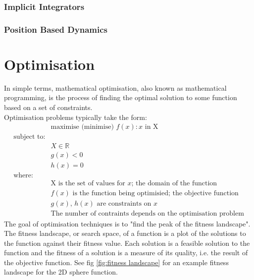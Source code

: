 \subsubsection{Implicit Integrators}

\subsubsection{Position Based Dynamics}

\section{Optimisation}
In simple terms, mathematical optimisation, also known as mathematical programming, is the process of finding the optimal solution to some function based on a set of constraints.
\\Optimisation problems typically take the form\cite{mathprog}:
\begin{equation}
  \begin{split}
    &\text{maximise (minimise) } f(x) : x \text{ in X}
    \\\text{subject to:}
    \\&X \in \mathbb{R}
    \\&g(x) < 0
    \\&h(x) = 0
    \\\text{where:}
    \\&\text{X is the set of values for } x \text{; the domain of the function}
    \\&f(x) \text{ is the function being optimisied; the objective function}
    \\&g(x) \text{, } h(x) \text{ are constraints on } x 
    \\&\text{The number of contraints depends on the optimisation problem}
  \end{split}
\label{eq:optimisation}
\end{equation}
The goal of optimisation techniques is to "find the peak of the fitness landscape"\cite{stoch}. The fitness landscape, or search space, of a function is a plot of the solutions to the function against their fitness value. Each solution is a feasible solution to the function and the fitness of a solution is a measure of its quality, i.e. the result of the objective function. See fig \ref{fig:fitness landscape}\cite{fitland} for an example fitness landscape for the 2D sphere function.
